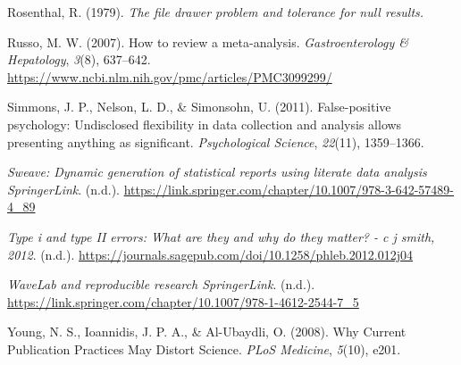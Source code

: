 \documentclass[
  a4paper,
]{article}
\newlength{\cslhangindent}
\newenvironment{CSLReferences}[2] %
 {\begin{list}{}{%
  \setlength{\itemindent}{0pt}
  \setlength{\leftmargin}{0pt}
  \setlength{\parsep}{0pt}
  \ifodd #1
   \setlength{\leftmargin}{\cslhangindent}
   \setlength{\itemindent}{-1\cslhangindent}
  \fi
  \setlength{\itemsep}{#2\baselineskip}}}
 {\end{list}}
\begin{document}
\begin{CSLReferences}{1}{0}
Rosenthal, R. (1979). \emph{The file drawer problem and tolerance for
null results.}

Russo, M. W. (2007). How to review a meta-analysis.
\emph{Gastroenterology \& Hepatology}, \emph{3}(8), 637--642.
\url{https://www.ncbi.nlm.nih.gov/pmc/articles/PMC3099299/}

Simmons, J. P., Nelson, L. D., \& Simonsohn, U. (2011). False-positive
psychology: {Undisclosed} flexibility in data collection and analysis
allows presenting anything as significant. \emph{Psychological Science},
\emph{22}(11), 1359--1366.

\emph{Sweave: Dynamic generation of statistical reports using literate
data analysis \textbar{} SpringerLink}. (n.d.).
\url{https://link.springer.com/chapter/10.1007/978-3-642-57489-4_89}

\emph{Type i and type II errors: What are they and why do they matter? -
c j smith, 2012}. (n.d.).
\url{https://journals.sagepub.com/doi/10.1258/phleb.2012.012j04}

\emph{WaveLab and reproducible research \textbar{} SpringerLink}.
(n.d.).
\url{https://link.springer.com/chapter/10.1007/978-1-4612-2544-7_5}

Young, N. S., Ioannidis, J. P. A., \& Al-Ubaydli, O. (2008). Why
{Current Publication Practices May Distort Science}. \emph{PLoS
Medicine}, \emph{5}(10), e201.

\end{CSLReferences}
\end{document}
